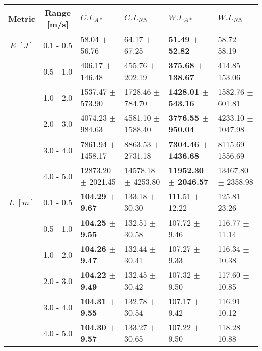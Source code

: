 \documentclass[final,5p,times,twocolumn]{elsarticle}
\begin{document}
\begin{table*}[!h]%
\centering
\begin{tabular}{ c c | l l l l } \hline \hline
  Metric & Range [m/s] & $C.I._{A*}$ & $C.I._{NN}$ & $W.I._{A*}$ & $W.I._{NN}$  \\ \hline \hline
  $E$ $[J]$     & 0.1 - 0.5 & 58.04 $\pm$ 56.76      & 64.17 $\pm$ 67.25      & \textbf{51.49 $\pm$ 52.82}      & 58.72 $\pm$ 58.19\\ 
                & 0.5 - 1.0 & 406.17 $\pm$ 146.48    & 455.76 $\pm$ 202.19    & \textbf{375.68 $\pm$ 138.67}    & 414.85 $\pm$ 153.06\\
                & 1.0 - 2.0 & 1537.47 $\pm$ 573.90   & 1728.46 $\pm$ 784.70   & \textbf{1428.01 $\pm$ 543.16}   & 1582.76 $\pm$ 601.81 \\
                & 2.0 - 3.0 & 4074.23 $\pm$ 984.63   & 4581.10 $\pm$ 1588.40  & \textbf{3776.55 $\pm$ 950.04}   & 4233.10 $\pm$ 1047.98\\
                & 3.0 - 4.0 & 7861.94 $\pm$ 1458.17  & 8863.53 $\pm$ 2731.18  & \textbf{7304.46 $\pm$ 1436.68}  & 8115.69 $\pm$ 1556.69\\
                & 4.0 - 5.0 & 12873.20 $\pm$ 2021.45 & 14578.18 $\pm$ 4253.80 & \textbf{11952.30 $\pm$ 2046.57} & 13467.80 $\pm$ 2358.98\\ \hline
                
  $L$ $[m]$     & 0.1 - 0.5 & \textbf{104.29 $\pm$ 9.67}      & 133.18 $\pm$ 30.30     & 111.51 $\pm$ 12.22     & 125.81 $\pm$ 23.26\\ 
                & 0.5 - 1.0 & \textbf{104.25 $\pm$ 9.55}      & 132.51 $\pm$ 30.58     & 107.72 $\pm$ 9.46      & 116.77 $\pm$ 11.14\\
                & 1.0 - 2.0 & \textbf{104.26 $\pm$ 9.47}      & 132.44 $\pm$ 30.41     & 107.27 $\pm$ 9.33      & 116.34 $\pm$ 10.38\\
                & 2.0 - 3.0 & \textbf{104.22 $\pm$ 9.49}      & 132.45 $\pm$ 30.42     & 107.32 $\pm$ 9.50      & 117.60 $\pm$ 10.85\\
                & 3.0 - 4.0 & \textbf{104.31 $\pm$ 9.55}      & 132.78 $\pm$ 30.54     & 107.17 $\pm$ 9.42      & 116.91 $\pm$ 10.12\\
                & 4.0 - 5.0 & \textbf{104.30 $\pm$ 9.57}      & 133.27 $\pm$ 30.65     & 107.22 $\pm$ 9.50      & 118.28 $\pm$ 10.88\\ \hline
                

\end{tabular}
\end{table*}
\end{document}
